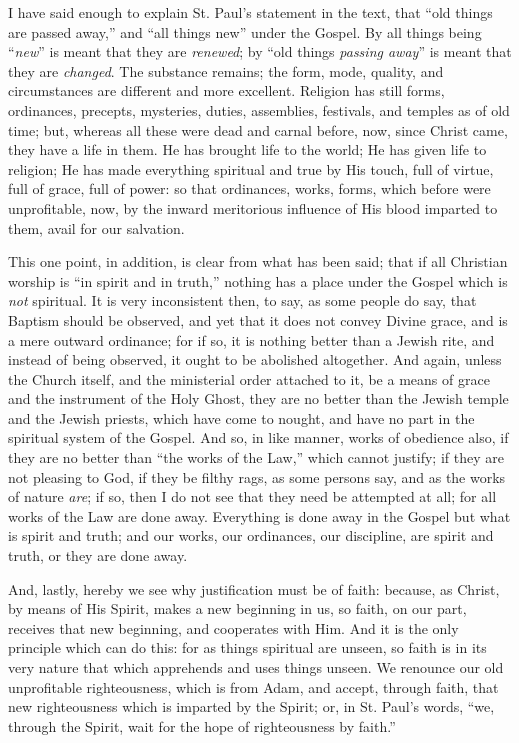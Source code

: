 I have said enough to explain St. Paul's statement in the text,
that ``old things are passed away,'' and ``all things
new'' under the Gospel. By all things being ``\emph{new}''
is meant that they are \emph{renewed}; by ``old things \emph{passing
away}'' is meant that they are \emph{changed}. The substance
remains; the form, mode, quality, and circumstances are different and
more excellent. Religion has still forms, ordinances, precepts,
mysteries, duties, assemblies, festivals, and temples as of old time;
but, whereas all these were dead and carnal before, now, since Christ
came, they have a life in them. He has brought life to the world; He
has given life to religion; He has made everything spiritual and true
by His touch, full of virtue, full of grace, full of power: so that
ordinances, works, forms, which before were unprofitable, now, by the
inward meritorious influence of His blood imparted to them, avail for
our salvation.

This one point, in addition, is clear from what has been said; that
if all Christian worship is ``in spirit and in truth,''
nothing has a place under the Gospel which is \emph{not} spiritual. It
is very inconsistent then, to say, as some people do say, that Baptism
should be observed, and yet that it does not convey Divine grace, and
is a mere outward ordinance; for if so, it is nothing better than a
Jewish rite, and instead of being observed, it ought to be abolished
altogether. And again, unless the Church itself, and the ministerial
order attached to it, be a means of grace and the instrument of the
Holy Ghost, they are no better than the Jewish temple and the Jewish
priests, which have come to nought, and have no part in the spiritual
system of the Gospel. And so, in like manner, works of obedience also,
if they are no better than ``the works of the Law,'' which
cannot justify; if they are not pleasing to God, if they be filthy
rags, as some persons say, and as the works of nature \emph{are}; if
so, then I do not see that they need be attempted at all; for all
works of the Law are done away. Everything is done away in the Gospel
but what is spirit and truth; and our works, our ordinances, our
discipline, are spirit and truth, or they are done away.

And, lastly, hereby we see why justification must be of faith:
because, as Christ, by means of His Spirit, makes a new beginning in
us, so faith, on our part, receives that new beginning, and cooperates
with Him. And it is the only principle which can do this: for as
things spiritual are unseen, so faith is in its very nature that which
apprehends and uses things unseen. We renounce our old unprofitable
righteousness, which is from Adam, and accept, through faith, that new
righteousness which is imparted by the Spirit; or, in St. Paul's
words, ``we, through the Spirit, wait for the hope of
righteousness by faith.''

